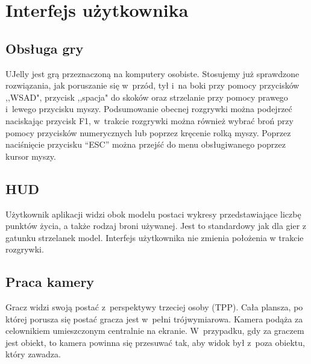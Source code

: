 \chapter{Interfejs użytkownika}

\section{Obsługa gry}
UJelly jest grą przeznaczoną na komputery osobiste. Stosujemy już sprawdzone rozwiązania, jak poruszanie się w~przód, tył i~na boki przy pomocy przycisków ,,WSAD", przycisk ,,spacja" do skoków oraz strzelanie przy pomocy prawego i~lewego przycisku myszy. 
Podsumowanie obecnej rozgrywki można podejrzeć naciskając przycisk F1, w~trakcie rozgrywki można również wybrać broń przy pomocy przycisków numerycznych lub poprzez kręcenie rolką myszy. Poprzez naciśnięcie przycisku “ESC” można przejść do menu obsługiwanego poprzez kursor myszy.

\section{HUD}
Użytkownik aplikacji widzi obok modelu postaci wykresy przedstawiające liczbę punktów życia, a także rodzaj broni używanej. Jest to standardowy jak dla gier z gatunku strzelanek model. Interfejs użytkownika nie zmienia położenia w trakcie rozgrywki.

\section{Praca kamery}
Gracz widzi swoją postać z~perspektywy trzeciej osoby (TPP). Cała plansza, po której porusza się postać gracza jest w~pełni trójwymiarowa. Kamera podąża za celownikiem umieszczonym centralnie na ekranie. W~przypadku, gdy za graczem jest obiekt, to kamera powinna się przesuwać tak, aby widok był z~poza obiektu, który zawadza.

